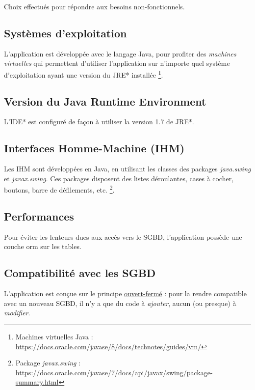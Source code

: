 Choix effectués pour répondre aux besoins non-fonctionnels.

\subsection{Systèmes d'exploitation}
L'application est développée avec le langage Java, pour profiter des \textit{machines virtuelles} qui permettent d'utiliser l'application sur n'importe quel système d'exploitation ayant une version du \gls{JRE}* installée
\footnote{\label{les_machines_virtuelles}Machines virtuelles Java : \url{https://docs.oracle.com/javase/8/docs/technotes/guides/vm/}}.

\subsection{Version du Java Runtime Environment}
L'\gls{IDE}* est configuré de façon à utiliser la version 1.7 de \gls{JRE}*.

\subsection{Interfaces Homme-Machine (IHM)}
Les IHM sont développées en Java, en utilisant les classes des packages \textit{java.swing} et \textit{javax.swing}. Ces packages disposent des listes déroulantes, cases à cocher, boutons, barre de défilements, etc.
\footnote{\label{element_de_formulaire}Package \textit{javax.swing} : \url{https://docs.oracle.com/javase/7/docs/api/javax/swing/package-summary.html}}.

\subsection{Performances}
Pour éviter les lenteurs dues aux accès vers le SGBD, l'application possède une couche \gls{orm} sur les tables.

\subsection{Compatibilité avec les SGBD}
L'application est conçue sur le principe \underline{ouvert-fermé} : pour la rendre compatible avec un nouveau SGBD, il n'y a que du code à \textit{ajouter}, aucun (ou presque) à \textit{modifier}.
